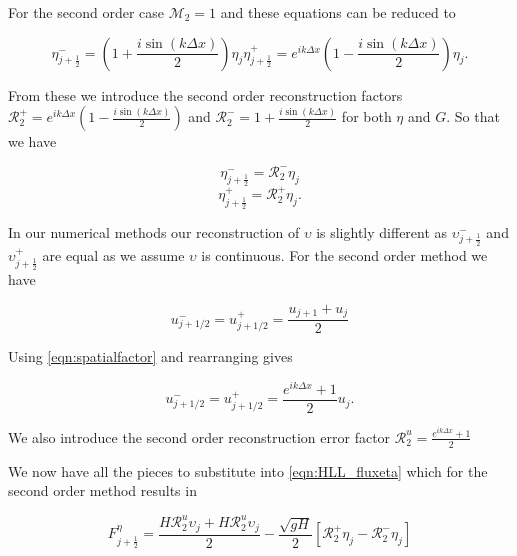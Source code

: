 For the second order case $\mathcal{M}_2 = 1$ and these equations can be reduced to 

\begin{subequations}
	\label{eqn:2ndrecon}
	\begin{equation}
	\eta^-_{j+\frac{1}{2}} = \left(1  + \frac{i\sin\left(k\Delta x\right)}{2} \right){\eta}_j
	\end{equation}
	\begin{equation}
	\eta^+_{j+\frac{1}{2}} = e^{ik\Delta x}\left(1  - \frac{i\sin\left(k\Delta x\right)}{2} \right){\eta}_{j}.
	\end{equation}
\end{subequations}

From these we introduce the second order reconstruction factors $\mathcal{R}^+_2 = e^{ik\Delta x}\left(1  - \frac{i\sin\left(k\Delta x\right)}{2} \right)$ and $\mathcal{R}^-_2 = 1  + \frac{i\sin\left(k\Delta x\right)}{2}$ for both $\eta$ and $G$. So that we have 

\begin{equation*}
\eta^-_{j+\frac{1}{2}} = \mathcal{R}^-_2 {\eta}_j
\end{equation*}
\begin{equation*}
\eta^+_{j+\frac{1}{2}} = \mathcal{R}^+_2{\eta}_{j}.
\end{equation*}

In our numerical methods our reconstruction of $\upsilon$ is slightly different as $\upsilon ^-_{j+\frac{1}{2}}$ and $\upsilon ^+_{j+\frac{1}{2}}$ are equal as we assume $\upsilon$ is continuous. For the second order method we have

\begin{equation*}
u^-_{j + 1/2} = u^+_{j + 1/2} = \frac{u_{j+1} + u_{j}}{2}
\end{equation*}

Using \eqref{eqn:spatialfactor} and rearranging gives


\begin{equation}
\label{eqn:2ndreconu}
u^-_{j + 1/2} = u^+_{j + 1/2} = \frac{e^{ik\Delta x } + 1}{2} u_{j}.
\end{equation}

We also introduce the second order reconstruction error factor $\mathcal{R}^u_2 = \frac{e^{ik\Delta x } + 1}{2}$

We now have all the pieces to substitute into \eqref{eqn:HLL_fluxeta} which for the second order method results in

\begin{equation*}
F^{\eta}_{j+\frac{1}{2}} = \dfrac{ H  \mathcal{R}^u_2 \upsilon_{j}+ H\mathcal{R}^u_2 \upsilon_{j}}{ 2}  - \dfrac{ \sqrt{gH}}{ 2} \left [  \mathcal{R}^+_2 {\eta}_j -  \mathcal{R}^-_2 {\eta}_j \right ]
\end{equation*}

